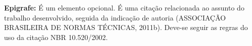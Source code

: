\textbf{Epigrafe:} É um elemento opcional. É uma citação relacionada ao assunto do trabalho desenvolvido, seguida da indicação de autoria 
(ASSOCIAÇÃO BRASILEIRA DE NORMAS TÉCNICAS, 2011b).   Deve-se seguir as regras do uso da citação NBR 10.520/2002.